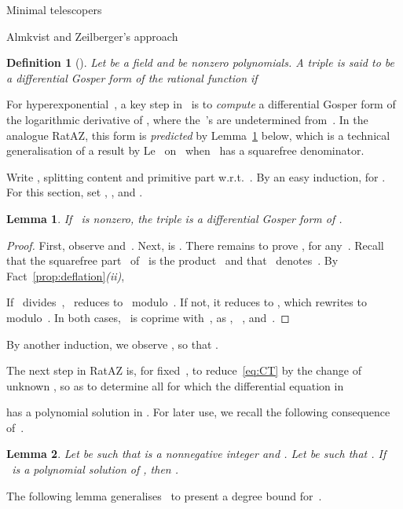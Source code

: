 \documentclass{sig-alt-full}
\newtheorem{lemma}{Lemma}
\newtheorem{definition}{Definition} \renewcommand{\thedefinition}{}
\begin{document}
\begin{section}{Minimal telescopers}
\begin{subsection}{Almkvist and Zeilberger's approach}
\begin{definition}[\cite{Gerhard2004}]
Let  be a field and  be non\-zero polynomials. A
triple  is said to be a \emph{differential Gosper
form\/} of the rational function  if

\end{definition}

For hyperexponential~, a key step in~\cite{Almkvist1990} is to
\emph{compute\/} a differential Gosper form of the logarithmic derivative of
, where the~'s are
undetermined from~.
In the analogue \textsf{RatAZ}, this form is \emph{predicted\/} by
Lemma~\ref{le:dGf-for-F'/F} below, which is a technical
generalisation of a result by Le~\cite{Le2000} on~ when~ has a
squarefree denominator.

Write , splitting content and primitive part
w.r.t.~.
By an easy induction,  for .
For this section, set , , and
.

\begin{lemma}\label{le:dGf-for-F'/F}
If ~is nonzero,
the triple  is a differential Gosper form of .
\end{lemma}

\begin{proof}
First, observe  and~.
Next,  is
.
There remains to prove , for
any~.
Recall that the squarefree part~ of~ is the product~
and that ~denotes~.
By Fact~\ref{prop:deflation}\emph{(ii)},

If ~divides~, ~reduces to~ modulo~.
If not, it reduces to ,
which rewrites to~ modulo~.
In both cases, ~is coprime with~, as , \ ,
and~.
\end{proof}

By another induction, we observe
,
so that
.

The next step in \textsf{RatAZ} is, for fixed~, to reduce~\eqref{eq:CT}
by the change of unknown , so as to determine all
 for which the differential equation in~

has a polynomial solution in .
For later use, we recall the following consequence
of~\cite[Corollary 9.6]{Gerhard2004}.

\begin{lemma}\label{le:polysol}
Let  be such that  is a
nonnegative integer and .
Let  be such that .
If ~is a polynomial solution of , then .
\end{lemma}
The following lemma generalises~\cite[Lemma~2]{Le2000}
to present a degree bound for~.



\begin{figure}
\end{figure}
\end{subsection}
\end{section}
\end{document}
